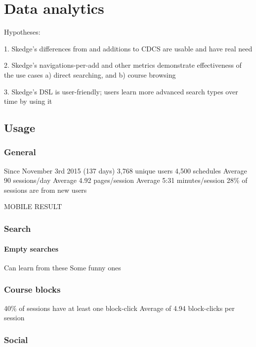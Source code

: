 
\chapter{Data analytics}

Hypotheses:

1. Skedge's differences from and additions to CDCS are usable and have real need

2. Skedge’s navigations-per-add and other metrics demonstrate effectiveness of the use cases
a) direct searching, and
b) course browsing

3. Skedge’s DSL is user-friendly; users learn more advanced search types over time by using it

\section{Usage}

\subsection{General}

Since November 3rd 2015 (137 days)
3,768 unique users
4,500 schedules
Average 90 sessions/day
Average 4.92 pages/session
Average 5:31 minutes/session
28\% of sessions are from new users

MOBILE RESULT

\subsection{Search}


  \subsubsection{Empty searches}

  Can learn from these
  Some funny ones

\subsection{Course blocks}

40\% of sessions have at least one block-click
Average of 4.94 block-clicks per session

\subsection{Social}

